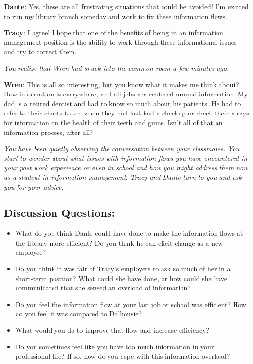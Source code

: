 \documentclass[
  letterpaper,
  DIV=11,
  numbers=noendperiod]{scrreprt}
\begin{document}
\textbf{Dante}: Yes, these are all frustrating situations that could be
avoided! I'm excited to run my library branch someday and work to fix
these information flows.

\textbf{Tracy}: I agree! I hope that one of the benefits of being in an
information management position is the ability to work through these
informational issues and try to correct them.

\emph{You realize that Wren had snuck into the common room a few minutes
ago.}

\textbf{Wren}: This is all so interesting, but you know what it makes me
think about? How information is everywhere, and all jobs are centered
around information. My dad is a retired dentist and had to know so much
about his patients. He had to refer to their charts to see when they had
last had a checkup or check their x-rays for information on the health
of their teeth and gums. Isn't all of that an information process, after
all?

\emph{You have been quietly observing the conversation between your
classmates. You start to wonder about what issues with information flows
you have encountered in your past work experience or even in school and
how you might address them now as a student in information management.
Tracy and Dante turn to you and ask you for your advice.}

\subsection{\texorpdfstring{\textbf{Discussion
Questions:}}{Discussion Questions:}}\label{discussion-questions-1}

\begin{itemize}
\item
  What do you think Dante could have done to make the information flows
  at the library more efficient? Do you think he can elicit change as a
  new employee?
\item
  Do you think it was fair of Tracy's employers to ask so much of her in
  a short-term position? What could she have done, or how could she have
  communicated that she sensed an overload of information?
\item
  Do you feel the information flow at your last job or school was
  efficient? How do you feel it was compared to Dalhousie?
\item
  What would you do to improve that flow and increase efficiency?
\item
  Do you sometimes feel like you have too much information in your
  professional life? If so, how do you cope with this information
  overload?
\end{itemize}
\end{document}
